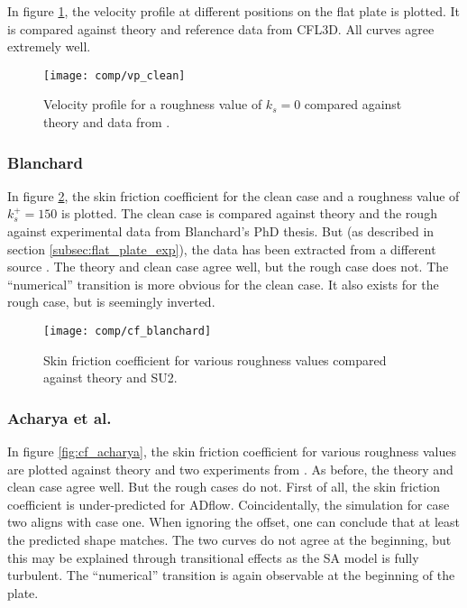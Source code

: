 \noindent In figure \ref{fig:vp_clean}, the velocity profile at different
positions on the flat plate is plotted. It is compared against theory and
reference data from CFL3D. All curves agree extremely well.
\begin{figure}[H] \centering
  \texttt{[image: comp/vp\_clean]}
    \caption{Velocity profile for a roughness value of $k_{s} = 0$ compared
      against theory and  data from \cite{rumsey_flat}.}
    \label{fig:vp_clean}
\end{figure}

\subsubsection{Blanchard}
In figure \ref{fig:cf_blanchard}, the skin friction coefficient for the clean
case and a roughness value of $k_{s}^{+} = 150$ is plotted. The clean case is
compared against theory and the rough against experimental data from Blanchard's
PhD thesis. But (as described in section \ref{subsec:flat_plate_exp}), the data
has been extracted from a different source \cite{sa_rough}. The theory and clean
case agree well, but the rough case does not. The ``numerical'' transition is
more obvious for the clean case. It also exists for the rough case, but is
seemingly inverted.

\begin{figure}[H] \centering
  \texttt{[image: comp/cf\_blanchard]}
    \caption{Skin friction coefficient for various roughness values compared
      against theory and SU2.}
    \label{fig:cf_blanchard}
\end{figure}


\subsubsection{Acharya et al.}
In figure \ref{fig:cf_acharya}, the skin friction coefficient for various
roughness values are plotted against theory and two experiments from
\cite{Acharya1986}. As before, the theory and clean case agree well. But the
rough cases do not. First of all, the skin friction coefficient is
under-predicted for ADflow. Coincidentally, the simulation for case two aligns
with case one. When ignoring the offset, one can conclude that at least the
predicted shape matches. The two curves do not agree at the beginning, but this
may be explained through transitional effects as the SA model is fully
turbulent. The ``numerical'' transition is again observable at the beginning of
the plate.

